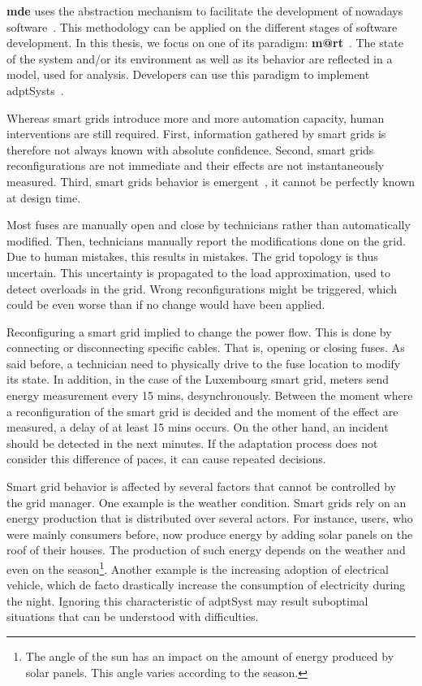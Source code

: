 \textbf{\Gls{mde}} uses the abstraction mechanism to facilitate the development of nowadays software~\cite{DBLP:journals/computer/Schmidt06, DBLP:conf/ifm/Kent02, DBLP:series/synthesis/2017Brambilla}.
This methodology can be applied on the different stages of software development.
In this thesis, we focus on one of its paradigm: \textbf{\gls{m@rt}}~\cite{DBLP:journals/computer/BlairBF09, DBLP:journals/computer/MorinBJFS09}.
The state of the system and/or its environment as well as its behavior are reflected in a model, used for analysis.
Developers can use this paradigm to implement \glspl{adptSyst}~\cite{DBLP:journals/computer/MorinBJFS09, DBLP:conf/smartgridsec/0001FKNT14}.

\bigskip

Whereas smart grids introduce more and more automation capacity, human interventions are still required.
First, information gathered by smart grids is therefore not always known with absolute confidence.
Second, smart grids reconfigurations are not immediate and their effects are not instantaneously measured.
Third, smart grids behavior is emergent~\cite{zio2011uncertainties}, \ie it cannot be perfectly known at design time.

Most fuses are manually open and close by technicians rather than automatically modified.
Then, technicians manually report the modifications done on the grid.
Due to human mistakes, this results in mistakes.
The grid topology is thus uncertain.
This uncertainty is propagated to the load approximation, used to detect overloads in the grid.
Wrong reconfigurations might be triggered, which could be even worse than if no change would have been applied.

Reconfiguring a smart grid implied to change the power flow.
This is done by connecting or disconnecting specific cables.
That is, opening or closing fuses.
As said before, a technician need to physically drive to the fuse location to modify its state.
In addition, in the case of the Luxembourg smart grid, meters send energy measurement every 15 mins, desynchronously.
Between the moment where a reconfiguration of the smart grid is decided and the moment of the effect are measured, a delay of at least 15 mins occurs.
On the other hand, an incident should be detected in the next minutes.
If the adaptation process does not consider this difference of paces, it can cause repeated decisions.

Smart grid behavior is affected by several factors that cannot be controlled by the grid manager.
One example is the weather condition.
Smart grids rely on an energy production that is distributed over several actors.
For instance, users, who were mainly consumers before, now produce energy by adding solar panels on the roof of their houses.
The production of such energy depends on the weather and even on the season\footnote{The angle of the sun has an impact on the amount of energy produced by solar panels. This angle varies according to the season.}.
Another example is the increasing adoption of electrical vehicle, which de facto drastically increase the consumption of electricity during the night.
Ignoring this characteristic of \gls{adptSyst} may result suboptimal situations that can be understood with difficulties.

